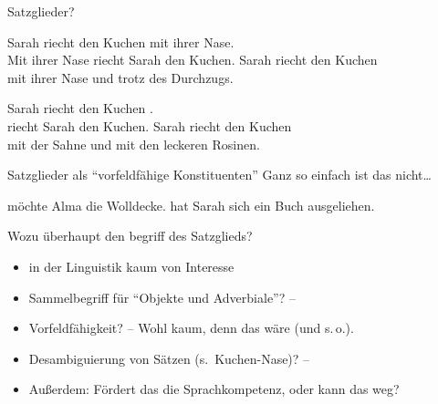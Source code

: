 \begin{frame}
  {Satzglieder?}
  \pause
  \begin{exe}
    \ex
    \begin{xlist}
      \ex Sarah riecht den Kuchen \alert<3->{mit ihrer Nase}.\\
      \pause
         \alert{Mit ihrer Nase} riecht Sarah den Kuchen.
        \pause
      \ex {} Sarah riecht den Kuchen\\
      {}\alert{mit ihrer Nase} und \alert{trotz des Durchzugs}.
    \end{xlist}
    \pause
    \ex
    \begin{xlist}
      \ex Sarah riecht den Kuchen .\\
      \pause
         \Ast {} riecht Sarah den Kuchen.
        \pause
      \ex {} Sarah riecht den Kuchen\\
      {}\alert{mit der Sahne} und \alert{mit den leckeren Rosinen}.
    \end{xlist}
  \end{exe}
  \pause
\end{frame}

\begin{frame}
  {Satzglieder als "`vorfeldfähige Konstituenten"'}
  \pause
  Ganz so einfach ist das nicht\ldots\\
  \Zeile
  \pause
  \begin{exe}
    \ex {} möchte Alma die Wolldecke.
    \pause
    \ex {} hat Sarah sich \alert{ein Buch} ausgeliehen.
  \end{exe}
  \Zeile
  \pause
  \alert{Wozu überhaupt den begriff des Satzglieds?}
  \begin{itemize}[<+->]
    \item in der Linguistik kaum von Interesse
    \item Sammelbegriff für "`Objekte und Adverbiale"'? -- 
    \item Vorfeldfähigkeit? -- Wohl kaum, denn das wäre  (und s.\,o.).
    \item Desambiguierung von Sätzen (s.\ Kuchen-Nase)? --\\
    \item Außerdem: \alert{Fördert das die Sprachkompetenz, oder kann das weg?}
  \end{itemize}
\end{frame}

